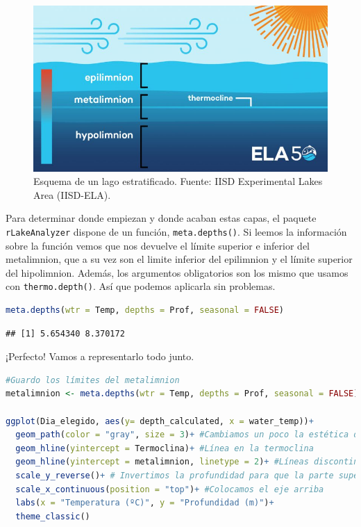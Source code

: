 \documentclass[
]{book}
\newcommand{\passthrough}[1]{#1}
\begin{document}
\begin{figure}

{\centering \includegraphics[width=1\linewidth]{Img/Stratified_lake} 

}

\caption{Esquema de un lago estratificado. Fuente: IISD Experimental Lakes Area (IISD-ELA).}\label{fig:unnamed-chunk-52}
\end{figure}

Para determinar donde empiezan y donde acaban estas capas, el paquete \passthrough{\lstinline!rLakeAnalyzer!} dispone de un función, \passthrough{\lstinline!meta.depths()!}. Si leemos la información sobre la función vemos que nos devuelve el límite superior e inferior del metalimnion, que a su vez son el limite inferior del epilimnion y el límite superior del hipolimnion. Además, los argumentos obligatorios son los mismo que usamos con \passthrough{\lstinline!thermo.depth()!}. Así que podemos aplicarla sin problemas.

\begin{lstlisting}[language=R]
meta.depths(wtr = Temp, depths = Prof, seasonal = FALSE)
\end{lstlisting}

\begin{lstlisting}
## [1] 5.654340 8.370172
\end{lstlisting}

¡Perfecto! Vamos a representarlo todo junto.

\begin{lstlisting}[language=R]
#Guardo los límites del metalimnion
metalimnion <- meta.depths(wtr = Temp, depths = Prof, seasonal = FALSE)

ggplot(Dia_elegido, aes(y= depth_calculated, x = water_temp))+
  geom_path(color = "gray", size = 3)+ #Cambiamos un poco la estética dándole color y grosor a la línea
  geom_hline(yintercept = Termoclina)+ #Línea en la termoclina
  geom_hline(yintercept = metalimnion, linetype = 2)+ #Líneas discontinuas defininedo el metalimnion
  scale_y_reverse()+ # Invertimos la profundidad para que la parte superior sea 0 metros.
  scale_x_continuous(position = "top")+ #Colocamos el eje arriba
  labs(x = "Temperatura (ºC)", y = "Profundidad (m)")+
  theme_classic()
\end{lstlisting}
\end{document}
